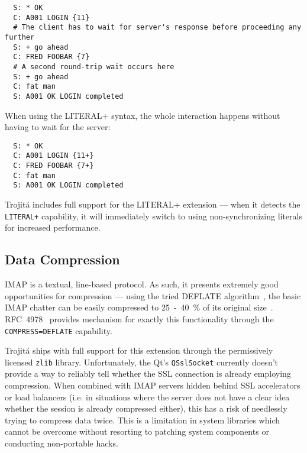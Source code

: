 \documentclass[trojita]{subfiles}
\begin{document}
\begin{verbatim}
  S: * OK
  C: A001 LOGIN {11}
  # The client has to wait for server's response before proceeding any further
  S: + go ahead
  C: FRED FOOBAR {7}
  # A second round-trip wait occurs here
  S: + go ahead
  C: fat man
  S: A001 OK LOGIN completed
\end{verbatim}

When using the LITERAL+ syntax, the whole interaction happens without having to wait for the server:

\begin{verbatim}
  S: * OK
  C: A001 LOGIN {11+}
  C: FRED FOOBAR {7+}
  C: fat man
  S: A001 OK LOGIN completed
\end{verbatim}

\begin{trojitabehavior}
Trojitá includes full support for the LITERAL+ extension --- when it detects the {\tt LITERAL+} capability, it will
immediately switch to using non-synchronizing literals for increased performance.
\end{trojitabehavior}

\subsection{Data Compression}

IMAP is a textual, line-based protocol.  As such, it presents extremely good opportunities for compression --- using the
tried DEFLATE algorithm~\cite{rfc1951}, the basic IMAP chatter can be easily compressed to 25~-~40~\% of its original
size~\cite[p. 4]{rfc4978}.  RFC~4978~\cite{rfc4978} provides mechanism for exactly this functionality through the {\tt
COMPRESS=DEFLATE} capability.

\begin{trojitabehavior}
Trojitá ships with full support for this extension through the permissively licensed {\tt zlib} library.  Unfortunately,
the Qt's {\tt QSslSocket} currently doesn't provide a way to reliably tell whether the SSL connection is already
employing compression.  When combined with IMAP servers hidden behind SSL accelerators or load balancers (i.e. in
situations where the server does not have a clear idea whether the session is already compressed either), this has a
risk of needlessly trying to compress data twice.  This is a limitation in system libraries which cannot be overcome
without resorting to patching system components or conducting non-portable hacks.
\end{trojitabehavior}
\end{document}
